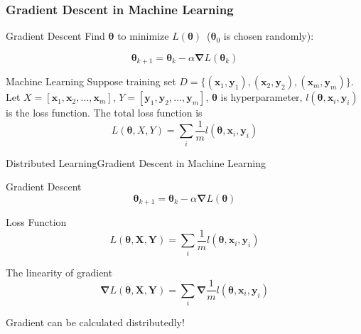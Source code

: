 \documentclass{beamer}
\begin{document}
\begin{frame}
    
\frametitle{Gradient Descent in Machine Learning}

\begin{block}{Gradient Descent}
    Find $\boldsymbol{\theta}$ to minimize $L(\boldsymbol{\theta})$\ ($\boldsymbol{\theta}_0$ is chosen randomly):

    \[\boldsymbol{\theta}_{k + 1} = \boldsymbol{\theta}_{k} - \alpha\boldsymbol{\nabla} L(\boldsymbol{\theta}_{k})\]
\end{block}

\begin{block}{Machine Learning}
    Suppose training set $D = \{(\boldsymbol{x}_1, \boldsymbol{y}_1), (\boldsymbol{x}_2, \boldsymbol{y}_2), (\boldsymbol{x}_m, \boldsymbol{y}_m)\}$. Let $X = [\boldsymbol{x}_1, \boldsymbol{x}_2, \dots, \boldsymbol{x}_m]$, $Y = [\boldsymbol{y}_1, \boldsymbol{y}_2, \dots, \boldsymbol{y}_m]$, $\boldsymbol{\theta}$ is hyperparameter, $l(\boldsymbol{\theta}, \boldsymbol{x}_i, \boldsymbol{y}_i)$ is the loss function. The total loss function is
    \[L(\boldsymbol{\theta}, X, Y) = \sum_{i}\frac{1}{m}l(\boldsymbol{\theta}, \boldsymbol{x}_i, \boldsymbol{y}_i)\]
\end{block}

\end{frame}

\begin{frame}{Distributed Learning}{Gradient Descent in Machine Learning}

\begin{block}{Gradient Descent}
    \[\boldsymbol{\theta}_{k + 1} = \boldsymbol{\theta}_{k} - \alpha\boldsymbol{\nabla} L(\boldsymbol{\theta})\]
\end{block}

\begin{block}{Loss Function}
    \[L(\boldsymbol{\theta}, \boldsymbol{X}, \boldsymbol{Y}) = \sum_{i}\frac{1}{m}l(\boldsymbol{\theta}, \boldsymbol{x}_i, \boldsymbol{y}_i)\]
\end{block}

\begin{block}{The linearity of gradient}
    \[\boldsymbol{\nabla} L(\boldsymbol{\theta}, \boldsymbol{X}, \boldsymbol{Y}) = \sum_{i}\boldsymbol{\nabla} \frac{1}{m}l(\boldsymbol{\theta}, \boldsymbol{x}_i, \boldsymbol{y}_i)\]
\end{block}

Gradient can be calculated distributedly!

\end{frame}
\end{document}
